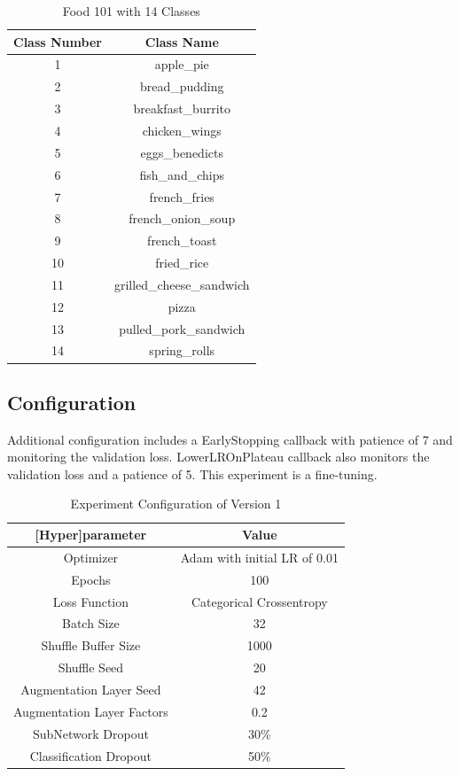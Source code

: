 \begin{table}[htbp]
  \centering
  \begin{tabular}{|c|c|}
    \hline
    \textbf{Class Number} & \textbf{Class Name} \\
    \hline
    1 & apple\_pie \\
    2 & bread\_pudding \\
    3 & breakfast\_burrito \\
    4 & chicken\_wings \\
    5 & eggs\_benedicts \\
    6 & fish\_and\_chips \\
    7 & french\_fries \\
    8 & french\_onion\_soup \\
    9 & french\_toast \\
    10 & fried\_rice \\
    11 & grilled\_cheese\_sandwich \\
    12 & pizza \\
    13 & pulled\_pork\_sandwich \\
    14 & spring\_rolls \\
    \hline
  \end{tabular}
  \caption{Food 101 with 14 Classes}
  \label{tab:f101c14}
\end{table}

\subsection{Configuration}
Additional configuration includes a EarlyStopping callback with patience of 7 and monitoring the validation loss. LowerLROnPlateau callback also monitors the validation loss and a patience of 5. This experiment is a fine-tuning.
\begin{table}[htbp]
  \centering
  \begin{tabular}{|c|c|}
    \hline
    \textbf{[Hyper]parameter} & \textbf{Value} \\
    \hline
    Optimizer & Adam with initial LR of 0.01 \\
    Epochs & 100 \\
    Loss Function & Categorical Crossentropy \\
    Batch Size & 32 \\
    Shuffle Buffer Size & 1000 \\
    Shuffle Seed & 20 \\
    Augmentation Layer Seed & 42 \\
    Augmentation Layer Factors & 0.2 \\
    SubNetwork Dropout & 30\% \\
    Classification Dropout & 50\% \\
    \hline
  \end{tabular}
  \caption{Experiment Configuration of Version 1}
  \label{tab:config-v1}
\end{table}


